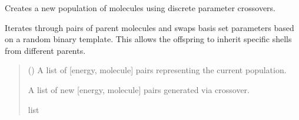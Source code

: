 \documentclass[letterpaper,10pt,english]{sphinxmanual}
\begin{document}

\begin{fulllineitems}
\label{\detokenize{api:MSTOOptpar.CrossOvers}}
\pysigstartsignatures
\pysiglinewithargsret
{}
{}
{}
\pysigstopsignatures
\sphinxAtStartPar
Creates a new population of molecules using discrete parameter crossovers.

\sphinxAtStartPar
Iterates through pairs of parent molecules and swaps basis set
parameters based on a random binary template. This allows the
offspring to inherit specific shells from different parents.
\begin{quote}\begin{description}
\sphinxAtStartPar
{} () \textendash{} A list of {[}energy, molecule{]} pairs representing the current population.

\sphinxAtStartPar
A list of new {[}energy, molecule{]} pairs generated via crossover.

\sphinxAtStartPar
list

\end{description}\end{quote}

\end{fulllineitems}

\end{document}
